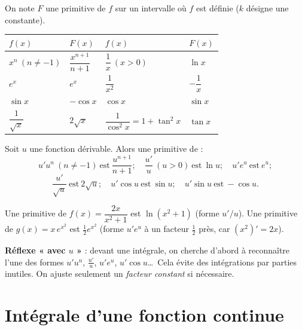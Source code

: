 \begin{propriete}
On note $F$ une primitive de $f$ sur un intervalle où $f$ est définie ($k$ désigne une constante).
\begin{center}\small
\begin{tabular}{@{}llll@{}}
\toprule
$f(x)$ & $F(x)$ & $f(x)$ & $F(x)$\\
\midrule
$x^{n}\ (n\ne-1)$ & $\dfrac{x^{n+1}}{n+1}$ & $\dfrac1x\ (x>0)$ & $\ln x$\\[5pt]
$e^{x}$ & $e^{x}$ & $\dfrac1{x^{2}}$ & $-\dfrac1x$\\[5pt]
$\sin x$ & $-\cos x$ & $\cos x$ & $\sin x$\\[5pt]
$\dfrac1{\sqrt x}$ & $2\sqrt x$ & $\dfrac1{\cos^{2}x}=1+\tan^2 x$ & $\tan x$\\
\bottomrule
\end{tabular}
\end{center}
\end{propriete}

\begin{propriete}
Soit $u$ une fonction dérivable. Alors une primitive de :
\[
u'u^{n}\ (n\ne-1)\ \text{est}\ \frac{u^{n+1}}{n+1};\quad
\frac{u'}{u}\ (u>0)\ \text{est}\ \ln u;\quad
u'e^{u}\ \text{est}\ e^{u};
\]
\[
\frac{u'}{\sqrt u}\ \text{est}\ 2\sqrt u;\quad
u'\cos u\ \text{est}\ \sin u;\quad
u'\sin u\ \text{est}\ -\cos u.
\]
\end{propriete}

\begin{exemple}
Une primitive de $f(x)=\dfrac{2x}{x^{2}+1}$ est $\ln(x^{2}+1)$ (forme $u'/u$).
Une primitive de $g(x)=x\,e^{x^{2}}$ est $\tfrac12 e^{x^{2}}$ (forme $u'e^{u}$ à un facteur $\tfrac12$ près,
car $(x^2)'=2x$).
\end{exemple}

\begin{aretenir}
\textbf{Réflexe « avec $u$ »} : devant une intégrale, on cherche d'abord à reconnaître l'une des
formes $u'u^n$, $\frac{u'}{u}$, $u'e^u$, $u'\cos u$\dots\ Cela évite des intégrations par parties
inutiles. On ajuste seulement un \emph{facteur constant} si nécessaire.
\end{aretenir}

\section{Intégrale d'une fonction continue}

